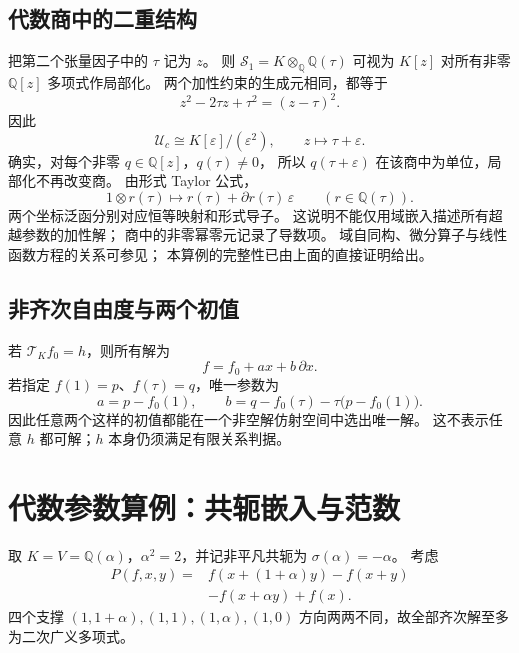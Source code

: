 \documentclass[UTF8,11pt,a4paper]{ctexart}
\theoremstyle{definition}
\newcommand{\Q}{\mathbb Q}
\newcommand{\T}{\mathcal T}
\newcommand{\Uc}{\mathscr U_c}
\numberwithin{equation}{section}
\begin{document}
\subsection{代数商中的二重结构}
把第二个张量因子中的 $\tau$ 记为 $z$。
则 $\mathscr S_1=K\otimes_{\Q}\Q(\tau)$
可视为 $K[z]$ 对所有非零 $\Q[z]$ 多项式作局部化。
两个加性约束的生成元相同，都等于
\[
 z^2-2\tau z+\tau^2=(z-\tau)^2.
\]
因此
\begin{equation}\label{eq:dualnumbers}
 \Uc\cong K[\varepsilon]/(\varepsilon^2),\qquad z\longmapsto\tau+\varepsilon.
\end{equation}
确实，对每个非零 $q\in\Q[z]$，$q(\tau)\ne0$，
所以 $q(\tau+\varepsilon)$ 在该商中为单位，局部化不再改变商。
由形式 Taylor 公式，
\[
 1\otimes r(\tau)\longmapsto r(\tau)+\partial r(\tau)\,\varepsilon
 \qquad(r\in\Q(\tau)).
\]
两个坐标泛函分别对应恒等映射和形式导子。
这说明不能仅用域嵌入描述所有超越参数的加性解；
商中的非零幂零元记录了导数项。
域自同构、微分算子与线性函数方程的关系可参见\cite{KissLaczkovich}；
本算例的完整性已由上面的直接证明给出。

\subsection{非齐次自由度与两个初值}
若 $\T_Kf_0=h$，则所有解为
\[
 f=f_0+ax+b\,\partial x.
\]
若指定 $f(1)=p$、$f(\tau)=q$，唯一参数为
\[
 a=p-f_0(1),\qquad
 b=q-f_0(\tau)-\tau\bigl(p-f_0(1)\bigr).
\]
因此任意两个这样的初值都能在一个非空解仿射空间中选出唯一解。
这不表示任意 $h$ 都可解；$h$ 本身仍须满足有限关系判据。

\section{代数参数算例：共轭嵌入与范数}\label{sec:normexample}
取 $K=V=\Q(\alpha)$，$\alpha^2=2$，并记非平凡共轭为
$\sigma(\alpha)=-\alpha$。
考虑
\begin{equation}\label{eq:normoperator}
 \begin{split}
 P(f,x,y)={}&f(x+(1+\alpha)y)-f(x+y)\\
 &-f(x+\alpha y)+f(x).
 \end{split}
\end{equation}
四个支撑 $(1,1+\alpha),(1,1),(1,\alpha),(1,0)$
方向两两不同，故全部齐次解至多为二次广义多项式。
\end{document}

